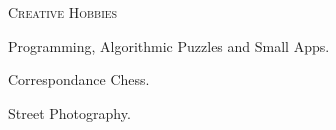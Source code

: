 \documentclass[10pt]{article}
\begin{document}
\vspace{0.16in}

\noindent
\textcolor{Primary}{{\large \textsc{Creative Hobbies}}}
\begin{list}{}{\leftmargin=0em}
  \setlength{\itemsep}{1pt}
  \setlength{\parskip}{0pt}
  \setlength{\parsep}{0pt}
  \item{Programming, Algorithmic Puzzles and Small Apps.}
  \item{Correspondance Chess.}
  \item{Street Photography.}
\end{list}
\end{document}
